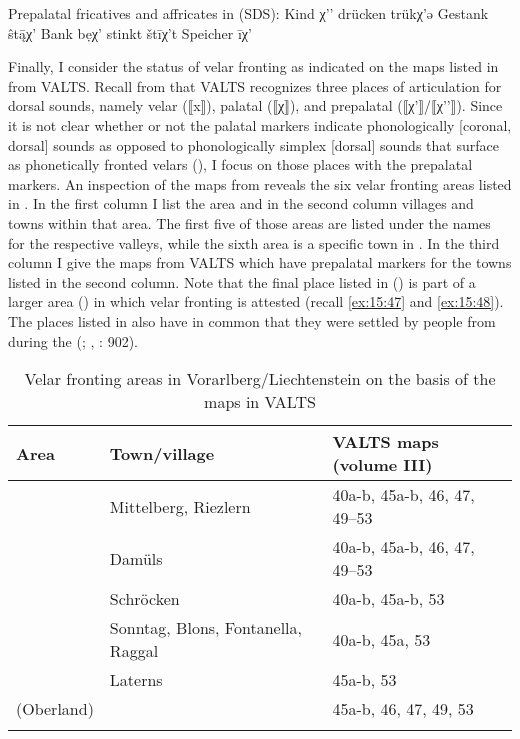 \ea%
\label{ex:15:50}Prepalatal fricatives and affricates in  (SDS):
\ea Kind \tab χ'{}'
\ex drücken \tab trükχ'ə
\ex Gestank \tab ŝt\={ą}χ'
\ex Bank \tab bẹχ'
\ex stinkt \tab štīχ't
\ex Speicher \tab īχ'
\z
\z 

Finally, I consider the status of velar fronting as indicated on the maps listed in  from VALTS. Recall from  that VALTS recognizes three places of articulation for dorsal sounds, namely velar (⟦x⟧), palatal (⟦χ⟧), and prepalatal (⟦χ'⟧/⟦χ'{}'⟧). Since it is not clear whether or not the palatal markers indicate phonologically [coronal, dorsal] sounds as opposed to phonologically simplex [dorsal] sounds that surface as phonetically fronted velars (), I focus on those places with the prepalatal markers. An inspection of the maps from  reveals the six velar fronting areas listed in . In the first column I list the area and in the second column villages and towns within that area. The first five of those areas are listed under the names for the respective valleys, while the sixth area is a specific town in . In the third column I give the maps from VALTS which have prepalatal markers for the towns listed in the second column. Note that the final place listed in  () is part of a larger area () in which velar fronting is attested (recall \ref{ex:15:47} and \ref{ex:15:48}). The places listed in  also have in common that they were settled by people from  during the  (; \citealt{Bohnenberger1913}, \citealt{Wiesinger1983b}: 902).

\begin{table}
\caption{Velar fronting areas in Vorarlberg/Liechtenstein on the basis of the maps in VALTS\label{tab:15.8}}
\begin{tabularx}{\textwidth}{lQl}
\lsptoprule
Area & Town/village & VALTS maps (volume III)\\\midrule
{} & Mittelberg, Riezlern & 40a-b, 45a-b, 46, 47, 49--53\\
 & Damüls & 40a-b, 45a-b, 46, 47, 49--53\\
 & Schröcken & 40a-b, 45a-b, 53\\
 & Sonntag, Blons, Fontanella, Raggal & 40a-b, 45a, 53\\
 & Laterns & 45a-b, 53\\
 (Oberland) &  & 45a-b, 46, 47, 49, 53\\
\lspbottomrule
\end{tabularx}
\end{table}

